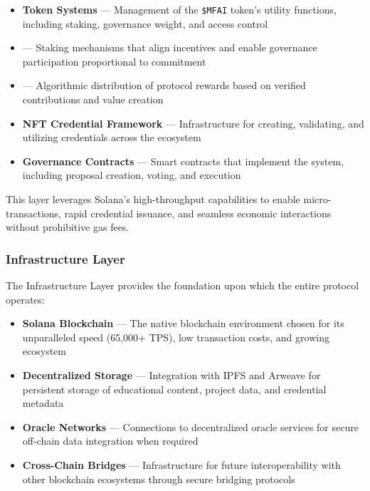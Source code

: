 \begin{itemize}
    \item \textbf{Token Systems} — Management of the \texttt{\$MFAI} token's utility functions, including staking, governance weight, and access control
    
    \item \textbf{} — Staking mechanisms that align incentives and enable governance participation proportional to commitment
    
    \item \textbf{} — Algorithmic distribution of protocol rewards based on verified contributions and value creation
    
    \item \textbf{NFT Credential Framework} — Infrastructure for creating, validating, and utilizing  credentials across the ecosystem
    
    \item \textbf{Governance Contracts} — Smart contracts that implement the  system, including proposal creation, voting, and execution
\end{itemize}

This layer leverages Solana's high-throughput capabilities to enable micro-transactions, rapid credential issuance, and seamless economic interactions without prohibitive gas fees.

\subsubsection*{Infrastructure Layer}

The Infrastructure Layer provides the foundation upon which the entire protocol operates:

\begin{itemize}
    \item \textbf{Solana Blockchain} — The native blockchain environment chosen for its unparalleled speed (65,000+ TPS), low transaction costs, and growing ecosystem
    
    \item \textbf{Decentralized Storage} — Integration with IPFS and Arweave for persistent storage of educational content, project data, and credential metadata
    
    \item \textbf{Oracle Networks} — Connections to decentralized oracle services for secure off-chain data integration when required
    
    \item \textbf{Cross-Chain Bridges} — Infrastructure for future interoperability with other blockchain ecosystems through secure bridging protocols
\end{itemize}

